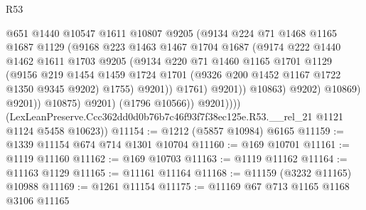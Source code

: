 \begin{lexlean}{R53}
\begin{coremodule}
                                @651
                                @1440
                                @10547
                                @1611
                                @10807
                                @9205
                                (@9134
                                  @224
                                  @71
                                  @1468
                                  @1165
                                  @1687
                                  @1129
                                  (@9168
                                    @223
                                    @1463
                                    @1467
                                    @1704
                                    @1687
                                    (@9174
                                      @222
                                      @1440
                                      @1462
                                      @1611
                                      @1703
                                      @9205
                                      (@9134
                                        @220
                                        @71
                                        @1460
                                        @1165
                                        @1701
                                        @1129
                                        (@9156
                                          @219
                                          @1454
                                          @1459
                                          @1724
                                          @1701
                                          (@9326 @200 @1452 @1167 @1722 @1350 @9345 @9202)
                                          @1755)
                                        @9201))
                                    @1761)
                                  @9201))
                              @10863)
                            @9202)
                          @10869)
                        @9201))
                    @10875)
                  @9201)
                (@1796 @10566))
              @9201))))
      (LexLeanPreserve.Ccc362dd0d0b76b7c46f93f7f38ec125e.R53.__rel_21 @1121 @1124 @5458 @10623))
@11154 := @1212 (@5857 @10984) @6165
@11159 := @1339 @11154 @674 @714 @1301 @10704
@11160 := @169 @10701
@11161 := @1119 @11160
@11162 := @169 @10703
@11163 := @1119 @11162
@11164 := @11163 @1129
@11165 := @11161 @11164
@11168 := @11159 (@3232 @11165) @10988
@11169 := @1261 @11154
@11175 := @11169 @67 @713 @1165 @1168 @3106 @11165

\end{coremodule}
\end{lexlean}
